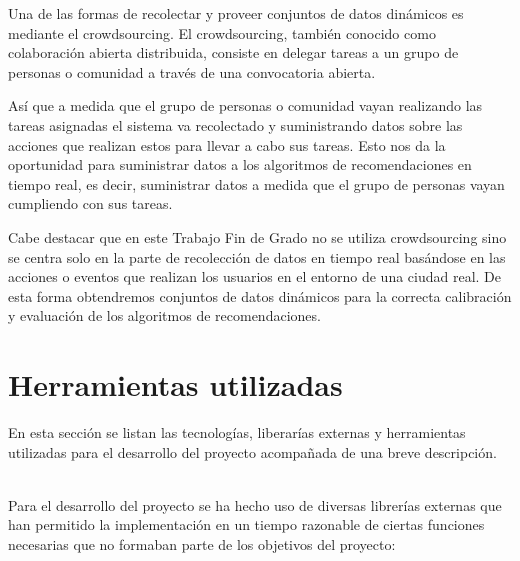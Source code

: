 Una de las formas de recolectar y proveer conjuntos de datos dinámicos es mediante el crowdsourcing. El crowdsourcing, también conocido como colaboración abierta distribuida, consiste en delegar tareas a un grupo de personas o comunidad a través de una convocatoria abierta. 

Así que a medida que el grupo de personas o comunidad vayan realizando las tareas asignadas el sistema va recolectado y suministrando datos sobre las acciones que realizan estos para llevar a cabo sus tareas. Esto nos da la oportunidad para suministrar datos a los algoritmos de recomendaciones en tiempo real, es decir, suministrar datos a medida que el grupo de personas vayan cumpliendo con sus tareas.

Cabe destacar que en este Trabajo Fin de Grado no se utiliza crowdsourcing sino se centra solo en la parte de recolección de datos en tiempo real basándose en las acciones o eventos que realizan los usuarios en el entorno de una ciudad real. De esta forma obtendremos conjuntos de datos dinámicos para la correcta calibración y evaluación de los algoritmos de recomendaciones. 

\section{Herramientas utilizadas}

En esta sección se listan las tecnologías, liberarías externas y herramientas utilizadas para el desarrollo del proyecto acompañada de una breve descripción.

\\

Para el desarrollo del proyecto se ha hecho uso de diversas librerías externas que han permitido la implementación en un tiempo razonable de ciertas funciones necesarias que no formaban parte de los objetivos del proyecto:

